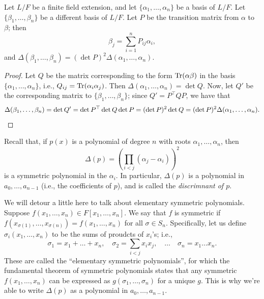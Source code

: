 \begin{corollary} \label{cor:discriminant_change_of_basis}
    Let $L/F$ be a finite field extension, and let $\{\alpha_1, \dots, \alpha_n\}$ be a basis of $L/F$. Let $\{\beta_1, \dots, \beta_n\}$ be a different basis of $L/F$. Let $P$ be the transition matrix from $\alpha$ to $\beta$; then
    \[ \beta_j = \sum_{i=1}^n P_{ij} \alpha_i, \]
    and $\Delta (\beta_1, \dots, \beta_n) = (\det P)^2 \Delta(\alpha_1, \dots, \alpha_n)$.
\end{corollary}
\begin{proof}
    Let $Q$ be the matrix corresponding to the form $\operatorname{Tr}(\alpha \beta)$ in the basis $\{\alpha_1, \dots, \alpha_n\}$, i.e., $Q_{ij} = \operatorname{Tr}(\alpha_i \alpha_j)$. Then $\Delta(\alpha_1, \dots, \alpha_n) = \det Q$. Now, let $Q'$ be the corresponding matrix to $\{\beta_1, \dots, \beta_n\}$; since $Q' = P^\top Q P$, we have that
    \[ \Delta(\beta_1, \dots, \beta_n) = \det Q' = \det P^\top \det Q \det P = (\det P)^2 \det Q = (\det P)^2 \Delta(\alpha_1, \dots, \alpha_n). \qedhere \]
\end{proof}

\newpage
Recall that, if $p(x)$ is a polynomial of degree $n$ with roots $\alpha_1, \dots, \alpha_n$, then
\[ \Delta(p) = \left(\prod_{i < j} (\alpha_j - \alpha_i)\right)^2 \]
is a symmetric polynomial in the $\alpha_i$. In particular, $\Delta(p)$ is a polynomial in $a_0, \dots, a_{n-1}$ (i.e., the coefficients of $p$), and is called the \textit{discrimnant of $p$}.

{\color{airforceblue} We will detour a little here to talk about elementary symmetric polynomials.} Suppose $f(x_1, \dots, x_n) \in F[x_1, \dots, x_n]$. We say that $f$ is symmetric if $f(x_{\sigma(1)}, \dots, x_{\sigma(n)}) = f(x_1, \dots, x_n)$ for all $\sigma \in S_n$. Specifically, let us define $\sigma_i(x_1, \dots, x_n)$ to be the sums of proudcts of $x_i$'s; i.e.,
\[ \sigma_1 = x_1 + \dots + x_n, \quad \sigma_2 = \sum_{i<j} x_i x_j, \quad \dots \quad \sigma_n = x_1 \dots x_n. \]
These are called the ``elementary symmetric polynomials'', for which the fundamental theorem of symmetric polynomials states that any symmetric $f(x_1, \dots, x_n)$ can be expressed as $g(\sigma_1, \dots, \sigma_n)$ for a unique $g$. This is why we're able to write $\Delta(p)$ as a polynomial in $a_0, \dots, a_{n-1}$.


